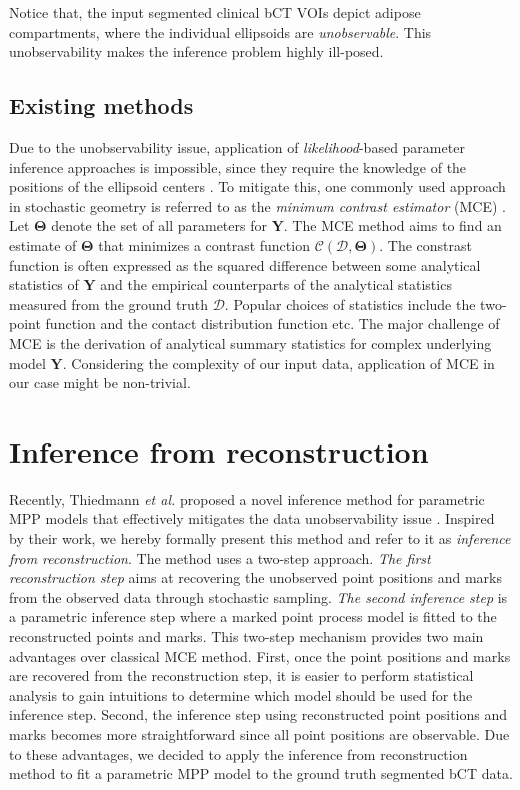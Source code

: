 \documentclass[journal]{IEEEtran}
\begin{document}
Notice that, the input segmented clinical bCT VOIs depict adipose
compartments, where the individual ellipsoids are
\textit{unobservable}. This unobservability makes the inference problem
highly ill-posed.

\subsection{Existing methods}
\label{sec:exist-param-infer}

Due to the unobservability issue, application of
\textit{likelihood}-based parameter inference approaches
\cite{moller2003statistical} is impossible, since they require the
knowledge of the positions of the ellipsoid centers
\cite{dereudre2014estimation}. To mitigate this, one commonly used
approach in stochastic geometry is referred to as the \textit{minimum
  contrast estimator} (MCE) \cite{chiu2013stochastic}. Let
$\mathbf{\Theta}$ denote the set of all parameters for
$\mathbf{Y}$. The MCE method aims to find an estimate of
$\mathbf{\Theta}$ that minimizes a contrast function
$\mathcal{C}(\mathcal{D}, \mathbf{\Theta})$. The constrast function is
often expressed as the squared difference between some analytical
statistics of $\mathbf{Y}$ and the empirical counterparts of the
analytical statistics measured from the ground truth
$\mathcal{D}$. Popular choices of statistics include the two-point
function \cite{diggle1981binary} and the contact distribution function
\cite {heinrich1993asymptotic} etc. The major challenge of MCE is the
derivation of analytical summary statistics for complex underlying
model $\mathbf{Y}$. Considering the complexity of our input data,
application of MCE in our case might be non-trivial.

\section{Inference from reconstruction}
\label{sec:meth-infer-from}

Recently, Thiedmann \textit{et al.} proposed a novel inference method
for parametric MPP models that effectively mitigates the data
unobservability issue \cite{thiedmann2011stochastic}. Inspired by
their work, we hereby formally present this method and refer to it as
\textit{inference from reconstruction}. The method uses a two-step
approach. \textit{The first reconstruction step} aims at recovering
the unobserved point positions and marks from the observed data
through stochastic sampling. \textit{The second inference step} is a
parametric inference step where a marked point process model is fitted
to the reconstructed points and marks. This two-step mechanism
provides two main advantages over classical MCE method. First, once
the point positions and marks are recovered from the reconstruction
step, it is easier to perform statistical analysis to gain intuitions
to determine which model should be used for the inference
step. Second, the inference step using reconstructed point positions
and marks becomes more straightforward since all point positions are
observable. Due to these advantages, we decided to apply the inference
from reconstruction method to fit a parametric MPP model to the ground
truth segmented bCT data.
\end{document}
